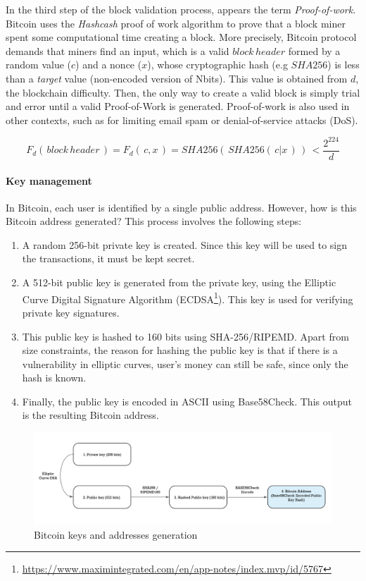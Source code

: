 In the third step of the block validation process, appears the term \textit{Proof-of-work}. Bitcoin uses the \textit{Hashcash} proof of work algorithm to prove that a block miner spent some computational time creating a block. More precisely, Bitcoin protocol demands that miners find an input, which is a valid $block \, header$ formed by a random value ($c$) and a nonce ($x$), whose cryptographic hash (e.g $SHA256$) is less than a \textit{target} value (non-encoded version of Nbits). This value is obtained from $d$, the blockchain difficulty. Then, the only way to create a valid block is simply trial and error until a valid Proof-of-Work is generated. Proof-of-work is also used in other contexts, such as for limiting email spam or denial-of-service attacks (DoS).

$$ F_d( \, block \, header \,) = F_d( \,c,x \,) = SHA256( \, SHA256( \, c|x \,) \,)\, < \frac{2^{224}}{d}$$

\paragraph{Key management}

In Bitcoin, each user is identified by a single public address. However, how is this Bitcoin address generated? This process involves the following steps:

\begin{enumerate}
	
	\item A random 256-bit private key is created. Since this key will be used to sign the transactions, it must be kept secret.
	\item A 512-bit public key is generated from the private key, using the Elliptic Curve Digital Signature Algorithm (ECDSA\footnote{\url{https://www.maximintegrated.com/en/app-notes/index.mvp/id/5767}}). This key is used for verifying private key signatures.
	\item This public key is hashed to 160 bits using SHA-256/RIPEMD. Apart from size constraints, the reason for hashing the public key is that if there is a vulnerability in elliptic curves, user's money can still be safe, since only the hash is known.
	\item Finally, the public key is encoded in ASCII using Base58Check. This output is the resulting Bitcoin address.
	
\end{enumerate}

\begin{figure}[bth]
  \centering
  \includegraphics[width=0.9\linewidth]{gfx/bitkeys}    
  \caption{Bitcoin keys and addresses generation \citep{BitcoinKey2018}}
  \label{fig:EthereumAccounts}
\end{figure}

